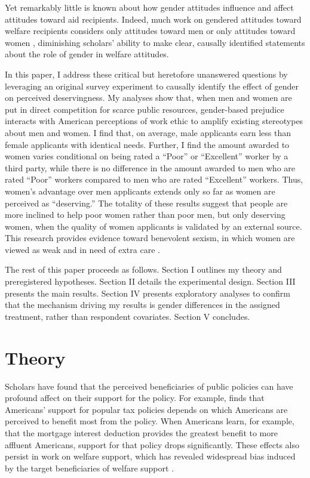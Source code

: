 \documentclass[12pt]{article}%
\begin{document}
\begin{doublespace}
Yet remarkably little is known about how gender attitudes influence and affect attitudes toward aid recipients. Indeed, much work on gendered attitudes toward welfare recipients considers only attitudes toward men \citep{petersen2012deserves, aaroe2014crowding, willrich2000home} or only attitudes toward women \citep{monnat2010color, desante_working_2013, hayes_2020, cassese2019intersectional}, diminishing scholars' ability to make clear, causally identified statements about the role of gender in welfare attitudes. 

In this paper, I address these critical but heretofore unanswered questions by leveraging an original survey experiment to causally identify the effect of gender on perceived deservingness. My analyses show that, when men and women are put in direct competition for scarce public resources, gender-based prejudice interacts with American perceptions of work ethic to amplify existing stereotypes about men and women. I find that, on average, male applicants earn less than female applicants with identical needs. Further, I find the amount awarded to women varies conditional on being rated a ``Poor” or ``Excellent” worker by a third party, while there is no difference in the amount awarded to men who are rated ``Poor” workers compared to men who are rated ``Excellent” workers. Thus, women’s advantage over men applicants extends only so far as women are perceived as ``deserving.” The totality of these results suggest that people are more inclined to help poor women rather than poor men, but only deserving women, when the quality of women applicants is validated by an external source. This research provides evidence toward benevolent sexism, in which women are viewed as weak and in need of extra care \citep{glick_hostile_1997, glick_ambivalent_2001}.

The rest of this paper proceeds as follows. Section I outlines my theory and preregistered hypotheses. Section II details the experimental design. Section III presents the main results. Section IV presents exploratory analyses to confirm that the mechanism driving my results is gender differences in the assigned treatment, rather than respondent covariates. Section V concludes.
\\

\section*{Theory}
Scholars have found that the perceived beneficiaries of public policies can have profound affect on their support for the policy. For example, \cite{mettler2011submerged} finds that Americans’ support for popular tax policies depends on which Americans are perceived to benefit most from the policy. When Americans learn, for example, that the mortgage interest deduction provides the greatest benefit to more affluent Americans, support for that policy drops significantly. These effects also persist in work on welfare support, which has revealed widespread bias induced by the target beneficiaries of welfare support \citep{gilens_why_2000, cassese2019intersectional, winter_beyond_2006, desante_working_2013, hayes_2020}.


\end{doublespace}
\end{document}
